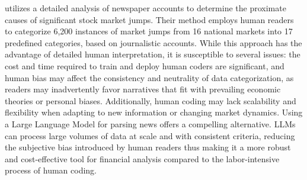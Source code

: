 \cite{baker2021triggers} utilizes a detailed analysis of newspaper accounts to determine the proximate causes of significant stock market jumps. Their method employs human readers to categorize 6,200 instances of market jumps from 16 national markets into 17 predefined categories, based on journalistic accounts. While this approach has the advantage of detailed human interpretation, it is susceptible to several issues: the cost and time required to train and deploy human coders are significant, and human bias may affect the consistency and neutrality of data categorization, as readers may inadvertently favor narratives that fit with prevailing economic theories or personal biases. Additionally, human coding may lack scalability and flexibility when adapting to new information or changing market dynamics. Using a Large Language Model for parsing news offers a compelling alternative. LLMs can process large volumes of data at scale and with consistent criteria, reducing the subjective bias introduced by human readers thus making it a more robust and cost-effective tool for financial analysis compared to the labor-intensive process of human coding.





